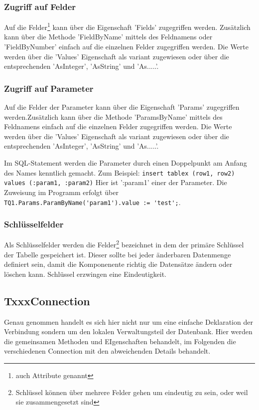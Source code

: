 \subsubsection{Zugriff auf Felder}
Auf die Felder\footnote{auch Attribute genannt} kann über die Eigenschaft 'Fields' zugegriffen werden. Zusätzlich kann über die Methode 'FieldByName' mittels des Feldnamens oder 'FieldByNumber' einfach auf die einzelnen Felder zugegriffen werden. Die Werte werden über die 'Values' Eigenschaft als variant zugewiesen oder über die entsprechenden 'AsInteger', 'AsString' und 'As.....'. 

\subsubsection{Zugriff auf Parameter}
Auf die Felder der Parameter kann über die Eigenschaft 'Params' zugegriffen werden.Zusätzlich kann über die Methode 'ParamsByName' mittels des Feldnamens einfach auf die einzelnen Felder zugegriffen werden. Die Werte werden über die 'Values' Eigenschaft als variant zugewiesen oder über die entsprechenden 'AsInteger', 'AsString' und 'As.....'. 

Im SQL-Statement werden die Parameter durch einen Doppelpunkt am Anfang des Names kenntlich gemacht. Zum Beispiel: \verb|insert tablex (row1, row2) values (:param1, :param2)| Hier ist ':param1' einer der Parameter. Die Zuweisung im Programm erfolgt über \verb|TQ1.Params.ParamByName('param1').value := 'test';|.

\subsubsection{Schlüsselfelder}
Als Schlüsselfelder werden die Felder\footnote{Schlüssel können über mehrere Felder gehen um eindeutig zu sein, oder weil sie zusammengesetzt sind} bezeichnet in dem der primäre Schlüssel der Tabelle gespeichert ist. Dieser sollte bei jeder änderbaren Datenmenge definiert sein, damit die Komponenente richtig die Datensätze ändern oder löschen kann. Schlüssel erzwingen eine Eindeutigkeit.


\subsection{TxxxConnection}
Genau genommen handelt es sich hier nicht nur um eine einfache Deklaration der Verbindung sondern um den lokalen Verwaltungsteil der Datenbank. 
Hier werden die gemeinsamen Methoden und EIgenschaften behandelt, im Folgenden die verschiedenen Connection mit den abweichenden Details behandelt.

